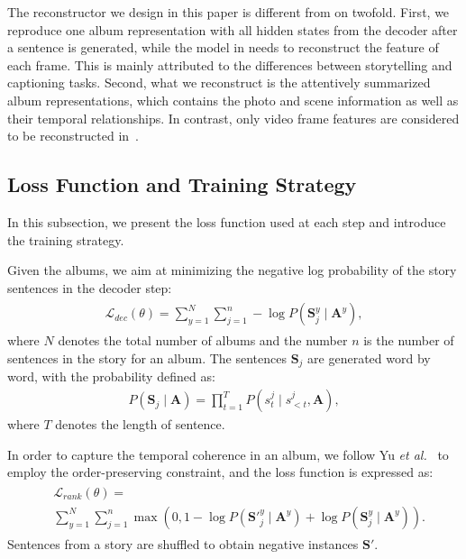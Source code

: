\documentclass[letterpaper]{article} \usepackage{aaai19}  \usepackage{times}  \usepackage{helvet}  \usepackage{courier}  \usepackage{url}  \usepackage{graphicx}  \usepackage{color}
\begin{document}
The reconstructor we design in this paper is different from \cite{wang2018reconstruction} on twofold. First, we reproduce one album representation with all hidden states from the decoder after a sentence is generated, while the model in \cite{wang2018reconstruction} needs to reconstruct the feature of each frame. This is mainly attributed to the differences between storytelling and captioning tasks. Second, what we reconstruct is the attentively summarized album representations, which contains the photo and scene information as well as their temporal relationships. In contrast, only video frame features are considered to be reconstructed in~\cite{wang2018reconstruction}.

\subsection{Loss Function and Training Strategy}
In this subsection, we present the loss function used at each step and introduce the training strategy.


Given the albums, we aim at minimizing the negative log probability of the story sentences in the decoder step:
\begin{align}
	\label{eq:optim}
    \begin{split}
        \mathcal{L}_{dec}(\theta) = \sum_{y=1}^{N}\sum_{j=1}^{n} -\log P\left(\mathbf{S}^y_j \mid \mathbf{A}^y\right),
    \end{split}
\end{align}
where $N$ denotes the total number of albums and the number $n$ is the number of sentences in the story for an album. The sentences $\mathbf{S}_j$ are generated word by word, with the probability defined  as:
\begin{align}
	\label{eq:probability}
    P\left(\mathbf{S}_j \mid \mathbf{A} \right) = \prod_{t=1}^{T} P\left(s_t^j \mid s_{<t}^j, \mathbf{A}\right),
\end{align}
where $T$ denotes the length of sentence.

In order to capture the temporal coherence in an album,
 we follow Yu \textit{et al.}~\cite{yu2017hierarchically} to employ the order-preserving constraint, and the loss function is expressed as:
\begin{align}
	\label{eq:rank_loss}
    \begin{split}
    &\mathcal{L}_{rank}(\theta) =\\
    & \sum_{y=1}^{N} \sum_{j=1}^n \max\left(0, 1-\log P\left({{\mathbf{S}}'}_j^y \mid \mathbf{A}^y\right) +\log P\left(\mathbf{S}_j^y \mid \mathbf{A}^y\right) \right).
    \end{split}
\end{align}
Sentences from a story are shuffled to obtain negative instances ${\mathbf{S}}'$.
\end{document}
